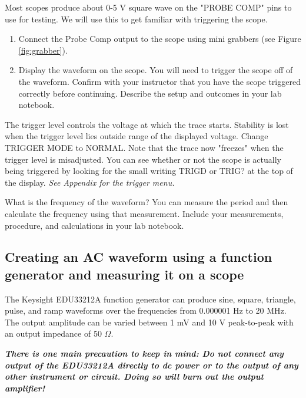 \documentclass[
]{article}
\begin{document}
Most scopes produce about 0-5 V square wave on the "PROBE COMP" pins to
use for testing. We will use this to get familiar with triggering the
scope.

\begin{enumerate}
\def\labelenumi{\arabic{enumi}.}
\item
  Connect the Probe Comp output to the scope using mini grabbers (see
  Figure \ref{fig:grabber}).
\item
  Display the waveform on the scope. You will need to trigger the scope
  off of the waveform. Confirm with your instructor that you have the
  scope triggered correctly before continuing. Describe the setup and
  outcomes in your lab notebook.
\end{enumerate}

The trigger level controls the voltage at which the trace starts.
Stability is lost when the trigger level lies outside range of the
displayed voltage. Change TRIGGER MODE to NORMAL. Note that the trace
now "freezes" when the trigger level is misadjusted. You can see whether
or not the scope is actually being triggered by looking for the small
writing TRIGD or TRIG? at the top of the display. \emph{See Appendix for
the trigger menu.}

What is the frequency of the waveform? You can measure the period and
then calculate the frequency using that measurement. Include your
measurements, procedure, and calculations in your lab notebook.

\hypertarget{creating-an-ac-waveform-using-a-function-generator-and-measuring-it-on-a-scope}{%
\subsection{Creating an AC waveform using a function generator and
measuring it on a
scope}\label{creating-an-ac-waveform-using-a-function-generator-and-measuring-it-on-a-scope}}

The Keysight EDU33212A function generator can produce sine, square,
triangle, pulse, and ramp waveforms over the frequencies from 0.000001
Hz to 20 MHz. The output amplitude can be varied between 1 mV and 10 V
peak-to-peak with an output impedance of 50 \(\Omega\).

\textbf{\emph{There is one main precaution to keep in mind: Do not
connect any output of the EDU33212A directly to dc power or to the
output of any other instrument or circuit. Doing so will burn out the
output amplifier!}}
\end{document}
